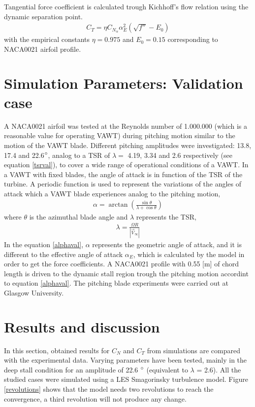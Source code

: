 \documentclass[a4paper]{jpconf}
\begin{document}
Tangential force coefficient is calculated trough Kichhoff's flow relation using the dynamic separation point.
\begin{align}
C_T = \eta C_{N_\alpha} \alpha_E ^2 ( \sqrt{f''}-E_0)     \label{CT}
\end{align}
with the empirical constants $\eta = 0.975$ and $E_0 = 0.15$ corresponding to NACA0021 airfoil profile.  





\section{Simulation Parameters: Validation case}
A NACA0021 airfoil was tested at the Reynolds number of 1.000.000 (which is a
reasonable value for operating VAWT) during pitching motion similar to the motion
of the VAWT blade. Different pitching amplitudes were investigated: 13.8, 17.4 and 22.6$\degree$, analog to a TSR of $\lambda=$ 4.19, 3.34 and 2.6 respectively (see equation \ref{tsrval}), to cover a wide range of operational conditions of a VAWT.  In a VAWT with
fixed blades, the angle of attack is in function of the TSR of the turbine. A
periodic function is used to represent the variations of the angles of attack
which a VAWT blade experiences analog to the pitching motion,
\begin{eqnarray}
    \alpha = \arctan \left( \frac{\sin \theta}{\lambda + \cos \theta} \right) \label{alphaval}
\end{eqnarray}
where $\theta$ is the azimuthal blade angle and $ \lambda $ represents the TSR,
\begin{eqnarray}
    \lambda =  \frac{\Omega R}{ |\vec{V}_\infty | } \label{tsrval}
\end{eqnarray}
In the equation \ref{alphaval}, $\alpha$ represents the geometric angle of attack, and it is different to the effective angle of attack $\alpha_E$, which is calculated by the model in order to get the force coefficients. A NACA0021 profile with 0.55 [m] of chord length is driven to the dynamic stall region trough the pitching motion accordint to equation \ref{alphaval}. The pitching blade experiments were carried out at Glasgow
University\cite{angell1988collected}.



\section{Results and discussion}
In this section, obtained results for $C_N$ and $C_T$ from simulations are compared with the experimental data. Varying parameters have been tested, mainly in the deep stall condition for an amplitude of 22.6 $\degree $ (equivalent to $\lambda$ = 2.6). All the studied cases were simulated using a LES Smagorinsky turbulence model. Figure \ref{revolutions} shows that the model needs two revolutions to reach the convergence, a third revolution will not produce any change. 
\end{document}
